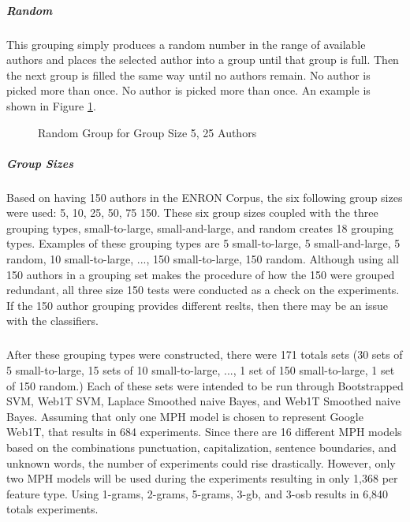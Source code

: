 		\subparagraph{Random} This grouping simply produces a random number in the range of available authors and places the selected author into a group until that group is full.  Then the next group is filled the same way until no authors remain.  No author is picked more than once. No author is picked more than once. An example is shown in Figure \ref{fig:randomGrouping}.
		\begin{figure}[ht!]
			\begin{center}
				\caption{Random Group for Group Size 5, 25 Authors}
				\label{fig:randomGrouping}
			\end{center}
		\end{figure}
		\subparagraph{Group Sizes} Based on having 150 authors in the ENRON Corpus, the six following group sizes were used: 5, 10, 25, 50, 75 150.  These six group sizes coupled with the three grouping types, small-to-large, small-and-large, and random creates 18 grouping types.  Examples of these grouping types are 5 small-to-large, 5 small-and-large, 5 random, 10 small-to-large, ..., 150 small-to-large, 150 random.  Although using all 150 authors in a grouping set makes the procedure of how the 150 were grouped redundant, all three size 150 tests were conducted as a check on the experiments. If the 150 author grouping provides different reslts, then there may be an issue with the classifiers.
		\subparagraph{}After these grouping types were constructed, there were 171 totals sets (30 sets of 5 small-to-large, 15 sets of 10 small-to-large, ..., 1 set of 150 small-to-large, 1 set of 150 random.)  Each of these sets were intended to be run through Bootstrapped SVM, Web1T SVM, Laplace Smoothed naive Bayes, and Web1T Smoothed naive Bayes.  Assuming that only one MPH model is chosen to represent Google Web1T, that results in 684 experiments.  Since there are 16 different MPH models based on the combinations punctuation, capitalization, sentence boundaries, and unknown words, the number of experiments could rise drastically.  However, only two MPH models will be used during the experiments resulting in only 1,368 per feature type.  Using 1-grams, 2-grams, 5-grams, 3-gb, and 3-osb results in 6,840 totals experiments.
	
